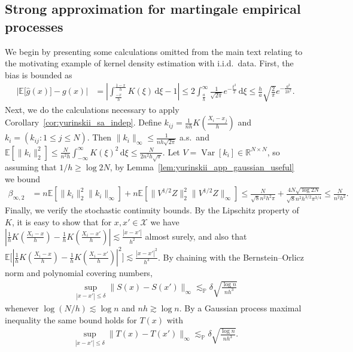 \documentclass[11pt,lof]{puthesis}
\renewcommand{\P}{\ensuremath{\mathbb{P}}}
\newcommand{\R}{\ensuremath{\mathbb{R}}}
\newcommand{\E}{\ensuremath{\mathbb{E}}}
\newcommand{\cX}{\ensuremath{\mathcal{X}}}
\DeclareMathOperator{\Var}{Var}
\newcommand{\diff}[1]{\,\mathrm{d}#1}
\theoremstyle{break}
\theoremstyle{proof}
\begin{document}
\subsection{Strong approximation for martingale empirical processes}

We begin by presenting some calculations omitted from the main text
relating to the motivating example of kernel density estimation with
i.i.d.\ data.
First, the bias is bounded as
%
\begin{align*}
  \big| \E \big[ \hat g(x) \big] - g(x) \big|
  &=
  \left|
    \int_{\frac{-x}{h}}^{\frac{1-x}{h}}
    K(\xi)
    \diff \xi
    - 1
  \right|
  \leq
  2 \int_{\frac{a}{h}}^\infty
  \frac{1}{\sqrt{2 \pi}}
  e^{-\frac{\xi^2}{2}}
  \diff \xi
  \leq
  \frac{h}{a}
  \sqrt{\frac{2}{\pi}}
  e^{-\frac{a^2}{2 h^2}}.
\end{align*}
%
Next, we do the calculations necessary to apply
Corollary~\ref{cor:yurinskii_sa_indep}.
Define $k_{i j} = \frac{1}{n h} K \left( \frac{X_i - x_j}{h} \right)$ and
$k_i = (k_{i j} : 1 \leq j \leq N)$.
Then $\|k_i\|_\infty \leq \frac{1}{n h \sqrt{2 \pi}}$ a.s.\ and
$\E[\|k_i\|_2^2] \leq \frac{N}{n^2 h} \int_{-\infty}^\infty K(\xi)^2 \diff \xi
\leq \frac{N}{2 n^2 h \sqrt{\pi}}$.
Let $V = \Var[k_i] \in \R^{N \times N}$,
so assuming that $1/h \geq \log 2 N$,
by Lemma~\ref{lem:yurinskii_app_gaussian_useful} we bound
%
\begin{align*}
  \beta_{\infty,2}
  &=
  n \E\left[\| k_i \|^2_2 \| k_i \|_\infty
  \right]
  + n \E \left[ \|V^{1/2} Z \|^2_2 \|V^{1/2} Z \|_\infty \right]
  \leq
  \frac{N}{\sqrt{8} n^2 h^2 \pi}
  + \frac{4 N \sqrt{\log 2 N}}{\sqrt{8} n^2 h^{3/2} \pi^{3/4}}
  \leq
  \frac{N}{n^2 h^2}.
\end{align*}
%
Finally, we verify the stochastic continuity bounds.
By the Lipschitz property of $K$, it is easy to show that
for $x,x' \in \cX$ we have
$\left|\frac{1}{h} K \left( \frac{X_i - x}{h} \right)
- \frac{1}{h} K \left( \frac{X_i - x'}{h} \right)\right|
\lesssim \frac{|x-x'|}{h^2}$ almost surely, and also that
$\E \Big[ \left|\frac{1}{h} K \left( \frac{X_i - x}{h} \right)
- \frac{1}{h} K \left( \frac{X_i - x'}{h} \right)\right|^2 \Big]
\lesssim \frac{|x-x'|^2}{h^3}$.
By chaining with the Bernstein--Orlicz norm and polynomial covering numbers,
%
\begin{align*}
  \sup_{|x-x'| \leq \delta}
  \big\|S(x) - S(x')\big\|_\infty
  \lesssim_\P
  \delta
  \sqrt{\frac{\log n}{n h^3}}
\end{align*}
%
whenever $\log(N/h) \lesssim \log n$ and $n h \gtrsim \log n$.
By a Gaussian process maximal inequality
\citep[Corollary~2.2.8]{van1996weak}
the same bound holds for $T(x)$ with
%
\begin{align*}
  \sup_{|x-x'| \leq \delta}
  \big\|T(x) - T(x')\big\|_\infty
  \lesssim_\P
  \delta
  \sqrt{\frac{\log n}{n h^3}}.
\end{align*}
\end{document}
